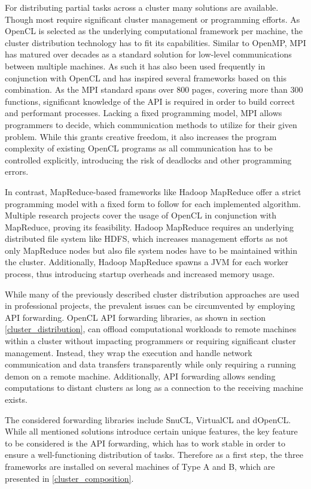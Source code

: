 For distributing partial tasks across a cluster many solutions are available. Though most require significant cluster management or programming efforts. As OpenCL is selected as the underlying computational framework per machine, the cluster distribution technology has to fit its capabilities.
Similar to OpenMP, MPI has matured over decades as a standard solution for low-level communications between multiple machines. As such it has also been used frequently in conjunction with OpenCL and has inspired several frameworks based on this combination\cite{mpi-acc}\cite{starpu}. As the MPI standard spans over 800 pages, covering more than 300 functions\cite{mpi_spec}, significant knowledge of the API is required in order to build correct and performant processes. Lacking a fixed programming model, MPI allows programmers to decide, which communication methods to utilize for their given problem. While this grants creative freedom, it also increases the program complexity of existing OpenCL programs as all communication has to be controlled explicitly, introducing the risk of deadlocks and other programming errors.

In contrast, MapReduce-based frameworks like Hadoop MapReduce offer a strict programming model with a fixed form to follow for each implemented algorithm. Multiple research projects cover the usage of OpenCL in conjunction with MapReduce, proving its feasibility\cite{hadoopcl}\cite{hadoop+}. Hadoop MapReduce requires an underlying distributed file system like HDFS, which increases management efforts as not only MapReduce nodes but also file system nodes have to be maintained within the cluster. Additionally, Hadoop MapReduce spawns a JVM for each worker process, thus introducing startup overheads and increased memory usage.

While many of the previously described cluster distribution approaches are used in professional projects, the prevalent issues can be circumvented by employing API forwarding. OpenCL API forwarding libraries, as shown in section \ref{cluster_distribution}, can offload computational workloads to remote machines within a cluster without impacting programmers or requiring significant cluster management. Instead, they wrap the execution and handle network communication and data transfers transparently while only requiring a running demon on a remote machine. Additionally, API forwarding allows sending computations to distant clusters as long as a connection to the receiving machine exists.

The considered forwarding libraries include SnuCL, VirtualCL and dOpenCL. While all mentioned solutions introduce certain unique features, the key feature to be considered is the API forwarding, which has to work stable in order to ensure a well-functioning distribution of tasks. Therefore as a first step, the three frameworks are installed on several machines of Type A and B, which are presented in \ref{cluster_composition}.

